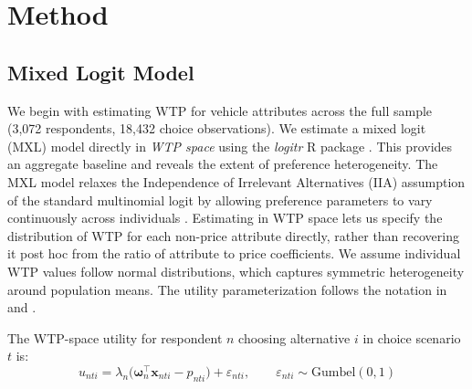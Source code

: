 \documentclass[a4paper,fleqn]{cas-sc}   %
\begin{document}
\begin{singlespace}

\end{singlespace}

\section{Method}
\label{section:method}
\subsection{Mixed Logit Model}

We begin with estimating WTP for vehicle attributes across the full sample (3,072 respondents, 18,432 choice observations). We estimate a mixed logit (MXL) model directly in \textit{WTP space} using the \textit{logitr} R package \parencite{helvestonLogitrFastEstimation2023}. This provides an aggregate baseline and reveals the extent of preference heterogeneity. The MXL model relaxes the Independence of Irrelevant Alternatives (IIA) assumption of the standard multinomial logit by allowing preference parameters to vary continuously across individuals \parencite{mcfaddenMixedMNLModels2000, trainDiscreteChoiceMethods2009}. Estimating in WTP space lets us specify the distribution of WTP for each non-price attribute directly, rather than recovering it post hoc from the ratio of attribute to price coefficients. We assume individual WTP values follow normal distributions, which captures symmetric heterogeneity around population means. The utility parameterization follows the notation in \textcite{helvestonPoolingStatedRevealed2018} and \textcite{helvestonLogitrFastEstimation2023}.

The WTP-space utility for respondent $n$ choosing alternative $i$ in choice scenario $t$ is:
\begin{equation}
    u_{nti} = \lambda_n \bigl(\boldsymbol{\omega}_n^{\top} \mathbf{x}_{nti} - p_{nti}\bigr) + \varepsilon_{nti}, \qquad \varepsilon_{nti} \sim \mathrm{Gumbel}(0,1)
    \label{eq:mxl_utility}
\end{equation}
\end{document}
